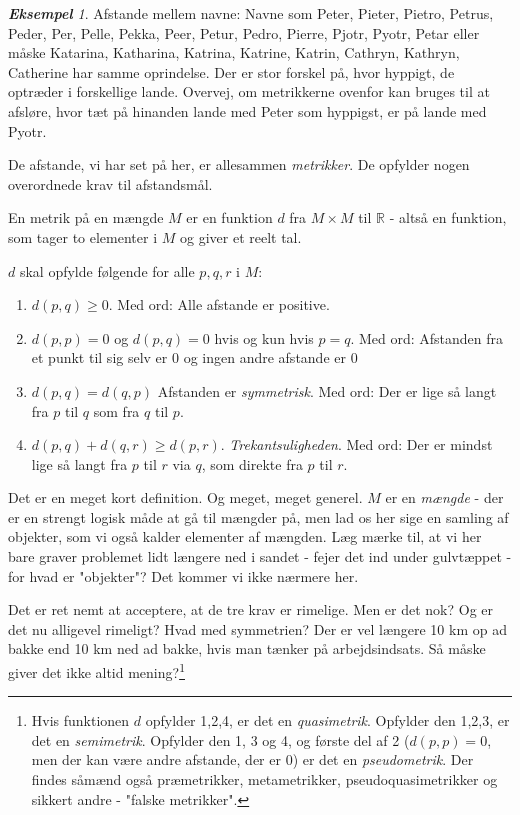 \documentclass[a4paper, 12pt]{article}
\theoremstyle{remark}
\newtheorem{Eksempel}{\textbf{Eksempel}}
\begin{document}
\begin{Eksempel}
Afstande mellem navne: Navne som Peter, Pieter, Pietro, Petrus, Peder, Per, Pelle, Pekka, Peer, Petur, Pedro, Pierre, Pjotr, Pyotr, Petar eller måske Katarina, Katharina, Katrina, Katrine, Katrin, Cathryn, Kathryn, Catherine har samme oprindelse. Der er stor forskel på, hvor hyppigt, de optræder i forskellige lande. Overvej, om metrikkerne ovenfor kan bruges til at afsløre, hvor tæt på hinanden lande med Peter som hyppigst, er på lande med Pyotr. 


\end{Eksempel}
De afstande, vi har set på her, er allesammen \emph{metrikker}. De opfylder nogen overordnede krav til afstandsmål. 
\begin{tcolorbox}[title=Metrik]
En metrik på en mængde $M$ er en funktion $d$ fra $M\times M$  til $\mathbb{R}$ - altså en funktion, som tager to elementer  i $M$ og giver et reelt tal.

$d$ skal opfylde følgende for alle $p,q,r$ i $M$:
\begin{enumerate}
\item $d(p,q)\geq 0$. Med ord: Alle afstande er positive.
\item $d(p,p)=0$ og $d(p,q)=0$ hvis og kun hvis $p=q$.  Med ord: Afstanden fra et punkt til sig selv er $0$ og ingen andre afstande er $0$
\item $d(p,q)=d(q,p)$ Afstanden er \emph{symmetrisk}. Med ord: Der er lige så langt fra $p$ til $q$ som fra $q$ til $p$.
\item $d(p,q)+d(q,r)\geq d(p,r)$. \emph{Trekantsuligheden}. Med ord:  Der er mindst lige så langt fra $p$ til $ r$ via $q$, som direkte fra $p$ til $r$. 
\end{enumerate}
\end{tcolorbox}

Det er en meget kort definition. Og meget, meget generel. $M$ er en \emph{mængde} - der er en strengt logisk måde at gå til mængder på, men lad os her sige en samling af objekter, som vi også kalder elementer af mængden. Læg mærke til, at vi her bare graver problemet lidt længere ned i sandet - fejer det ind under gulvtæppet - for hvad er "objekter"?  Det kommer vi ikke nærmere her. 

Det er ret nemt at acceptere, at de tre krav er rimelige. Men er det nok? Og er det nu alligevel rimeligt? Hvad med symmetrien? Der er vel længere 10 km op ad bakke end 10 km ned ad bakke, hvis man tænker på arbejdsindsats. Så måske giver det ikke altid mening?\footnote{ Hvis funktionen $d$ opfylder 1,2,4, er det en \emph{quasimetrik}. Opfylder den 1,2,3, er det en \emph{semimetrik}. Opfylder den 1, 3 og 4, og første del af 2 ($d(p,p)=0$, men der kan være andre afstande, der er $0$)  er det en \emph{pseudometrik}.  Der findes såmænd også præmetrikker, metametrikker, pseudoquasimetrikker og sikkert andre - "falske metrikker". }
\end{document}
